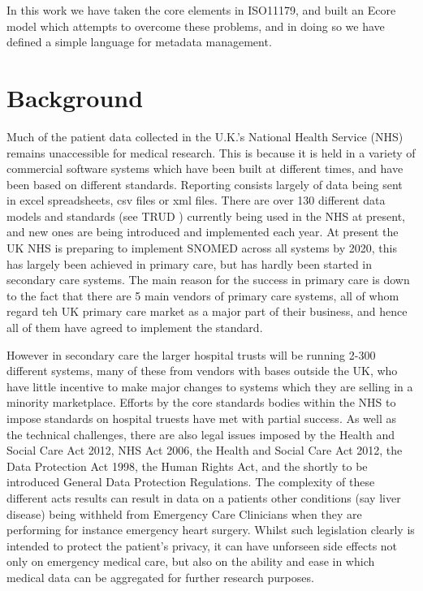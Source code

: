 \documentclass{llncs}
\begin{document}
In this work we have taken the core elements in ISO11179, and built an Ecore model which attempts to overcome these problems, and in doing so we have defined a simple language for metadata management.


\section{Background}



Much of the patient data collected in the U.K.'s National Health Service (NHS) remains unaccessible for medical research. This is because it is held in a variety of commercial software systems which have been built at different times, and have been based on different standards. Reporting consists largely of data being sent in excel spreadsheets, csv files or xml files.  There are over 130 different data models and standards (see TRUD \cite{TRUD}) currently being used in the NHS at present, and new ones are being introduced and implemented each year. At present the UK NHS is preparing to implement SNOMED across all systems by 2020, this has largely been achieved in primary care, but has hardly been started in secondary care systems. The main reason for the success in primary care is down to the fact that there are 5 main vendors of primary care systems, all of whom regard teh UK primary care market as a major part of their business, and hence all of them have agreed to implement the standard.  

However in secondary care the larger hospital trusts will be running 2-300 different systems, many of these from vendors with bases outside the UK, who have little incentive to make major changes to systems which they are selling in a minority marketplace. Efforts by the core standards bodies within the NHS to impose standards on hospital truests have met with partial success. As well as the technical challenges, there are also legal issues imposed by the Health and Social Care Act 2012, NHS Act 2006, the Health and Social Care Act 2012, the Data Protection Act 1998, the Human Rights Act, and the shortly to be introduced General Data Protection Regulations.  The complexity of these different acts results can result in data on a patients other conditions (say liver disease) being withheld from Emergency Care Clinicians when they are performing for instance emergency heart surgery. Whilst such legislation clearly is intended to protect the patient's privacy, it can have unforseen side effects not only on emergency medical care, but also on the ability and ease in which medical data can be aggregated for further research purposes.
\end{document}
